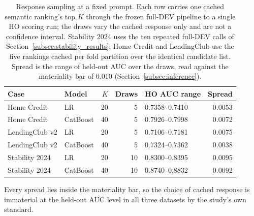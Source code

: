 \documentclass[final,5p,twocolumn]{elsarticle}
\newcommand{\Kfeat}{K}
\begin{document}
\begin{table}[htbp]
\centering
\footnotesize
\begin{threeparttable}
\caption{Response sampling at a fixed prompt. Each row carries one cached semantic ranking's top $\Kfeat$ through the frozen full-DEV pipeline to a single HO scoring run; the draws vary the cached response only and are not a confidence interval. Stability 2024 uses the ten repeated full-DEV calls of Section~\ref{subsec:stability_results}; Home Credit and LendingClub use the five rankings cached per fold partition over the identical candidate list. Spread is the range of held-out AUC over the draws, read against the materiality bar of $0.010$ (Section~\ref{subsec:inference}).}
\label{tab:response_spread}
\setlength{\tabcolsep}{5pt}
\begin{tabular}{@{}llrrlr@{}}
\toprule
Case & Model & $\Kfeat$ & Draws & HO AUC range & Spread \\
\midrule
Home Credit & LR & 20 & 5 & 0.7358--0.7410 & 0.0053 \\
Home Credit & CatBoost & 40 & 5 & 0.7926--0.7998 & 0.0072 \\
LendingClub v2 & LR & 20 & 5 & 0.7106--0.7181 & 0.0075 \\
LendingClub v2 & CatBoost & 40 & 5 & 0.7324--0.7362 & 0.0038 \\
\addlinespace
Stability 2024 & LR & 20 & 10 & 0.8300--0.8395 & 0.0095 \\
Stability 2024 & CatBoost & 40 & 10 & 0.8740--0.8832 & 0.0092 \\
\bottomrule
\end{tabular}
\begin{tablenotes}\footnotesize
\item Every spread lies inside the materiality bar, so the choice of cached response is immaterial at the held-out AUC level in all three datasets by the study's own standard.
\end{tablenotes}
\end{threeparttable}
\end{table}
\end{document}
